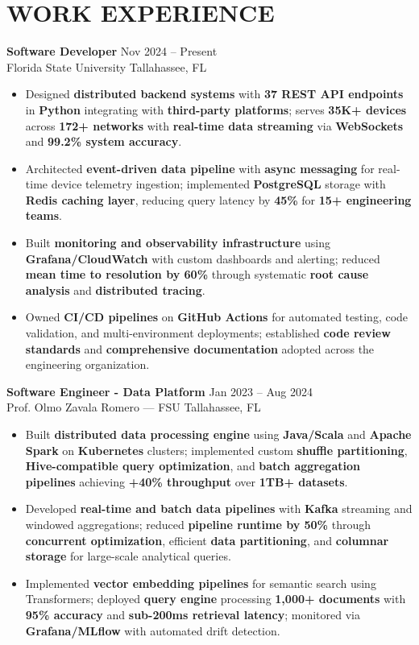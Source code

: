 \documentclass[letterpaper,10pt]{article}
\newcommand{\resumeItem}[1]{\item\small #1}
\newcommand{\resumeSubheading}[4]{
  \vspace{6pt}
  \noindent
  \textbf{#1} \hfill {\footnotesize #2} \\
  [-1pt]
  \noindent
  \small #3 \hfill {\small #4}
  \vspace{3pt}
}
\newcommand{\resumeItemsStart}{\vspace{-2pt}\begin{itemize}}
\newcommand{\resumeItemsEnd}{\end{itemize}\vspace{6pt}}
\begin{document}
\section{\textcolor{metablue}{WORK EXPERIENCE}}
\vspace{-12pt}

\resumeSubheading
{Software Developer}{Nov 2024 -- Present}
{Florida State University}{Tallahassee, FL}
\resumeItemsStart
\resumeItem{Designed \textbf{distributed backend systems} with \textbf{37 REST API endpoints} in \textbf{Python} integrating with \textbf{third-party platforms}; serves \textbf{35K+ devices} across \textbf{172+ networks} with \textbf{real-time data streaming} via \textbf{WebSockets} and \textbf{99.2\% system accuracy}.}
\resumeItem{Architected \textbf{event-driven data pipeline} with \textbf{async messaging} for real-time device telemetry ingestion; implemented \textbf{PostgreSQL} storage with \textbf{Redis caching layer}, reducing query latency by \textbf{45\%} for \textbf{15+ engineering teams}.}
\resumeItem{Built \textbf{monitoring and observability infrastructure} using \textbf{Grafana/CloudWatch} with custom dashboards and alerting; reduced \textbf{mean time to resolution by 60\%} through systematic \textbf{root cause analysis} and \textbf{distributed tracing}.}
\resumeItem{Owned \textbf{CI/CD pipelines} on \textbf{GitHub Actions} for automated testing, code validation, and multi-environment deployments; established \textbf{code review standards} and \textbf{comprehensive documentation} adopted across the engineering organization.}
\resumeItemsEnd
\vspace{-12pt}

\resumeSubheading
{Software Engineer - Data Platform}{Jan 2023 -- Aug 2024}
{Prof. Olmo Zavala Romero — FSU}{Tallahassee, FL}
\resumeItemsStart
\resumeItem{Built \textbf{distributed data processing engine} using \textbf{Java/Scala} and \textbf{Apache Spark} on \textbf{Kubernetes} clusters; implemented custom \textbf{shuffle partitioning}, \textbf{Hive-compatible query optimization}, and \textbf{batch aggregation pipelines} achieving \textbf{+40\% throughput} over \textbf{1TB+ datasets}.}
\resumeItem{Developed \textbf{real-time and batch data pipelines} with \textbf{Kafka} streaming and windowed aggregations; reduced \textbf{pipeline runtime by 50\%} through \textbf{concurrent optimization}, efficient \textbf{data partitioning}, and \textbf{columnar storage} for large-scale analytical queries.}
\resumeItem{Implemented \textbf{vector embedding pipelines} for semantic search using Transformers; deployed \textbf{query engine} processing \textbf{1,000+ documents} with \textbf{95\% accuracy} and \textbf{sub-200ms retrieval latency}; monitored via \textbf{Grafana/MLflow} with automated drift detection.}
\resumeItemsEnd
\vspace{-12pt}
\end{document}
